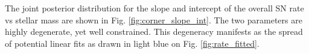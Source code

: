 \documentclass[fleqn,usenatbib]{mnras}
\begin{document}
The joint posterior distribution for the slope and intercept of the overall SN rate vs stellar mass are shown in Fig. \ref{fig:corner_slope_int}. The two parameters are highly degenerate, yet well constrained. This degeneracy manifests as the spread of potential linear fits as drawn in light blue on Fig. \ref{fig:rate_fitted}.





\bsp	%
\label{lastpage}
\end{document}
